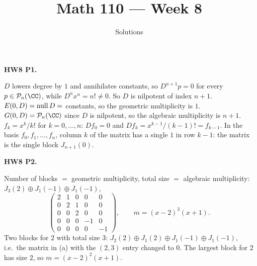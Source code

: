 \documentclass[10pt]{scrartcl}
\title{Math 110 --- Week 8}
\subtitle{Solutions}
\author{}\date{}\ihead{}
\begin{document}
\maketitle
\begin{prob}
\textbf{HW8 P1. }\par 
\begin{enumerate}[(a)]
  \ii {}$D$ lowers degree by $1$ and annihilates constants, so $D^{n+1}p=0$ for every $p\in\PP_n(\CC)$, while $D^nx^n=n!\ne0$. So $D$ is nilpotent of index $n+1$.
  \ii $E(0,D)=\operatorname{null} D=$ constants, so the geometric multiplicity is $1$. $G(0,D)=\PP_n(\CC)$ since $D$ is nilpotent, so the algebraic multiplicity is $n+1$.
  \ii {}$f_k=x^k/k!$ for $k=0,\dots,n$: $Df_0=0$ and $Df_k=x^{k-1}/(k-1)!=f_{k-1}$. In the basis $f_0,f_1,\dots,f_n$, column $k$ of the matrix has a single $1$ in row $k-1$: the matrix is the single block $J_{n+1}(0)$.
\end{enumerate}
\end{prob}

\begin{prob}
\textbf{HW8 P2. }\par 
\begin{enumerate}[(a)]
  \ii {}Number of blocks $=$ geometric multiplicity, total size $=$ algebraic multiplicity: $J_3(2)\oplus J_1(-1)\oplus J_1(-1)$,
  \[ \begin{pmatrix}2&1&0&0&0\\0&2&1&0&0\\0&0&2&0&0\\0&0&0&-1&0\\0&0&0&0&-1\end{pmatrix},\qquad m=(x-2)^3(x+1). \]
  \ii Two blocks for $2$ with total size $3$: $J_2(2)\oplus J_1(2)\oplus J_1(-1)\oplus J_1(-1)$, i.e.\ the matrix in (a) with the $(2,3)$ entry changed to $0$. The largest block for $2$ has size $2$, so $m=(x-2)^2(x+1)$.
\end{enumerate}
\end{prob}
\end{document}
